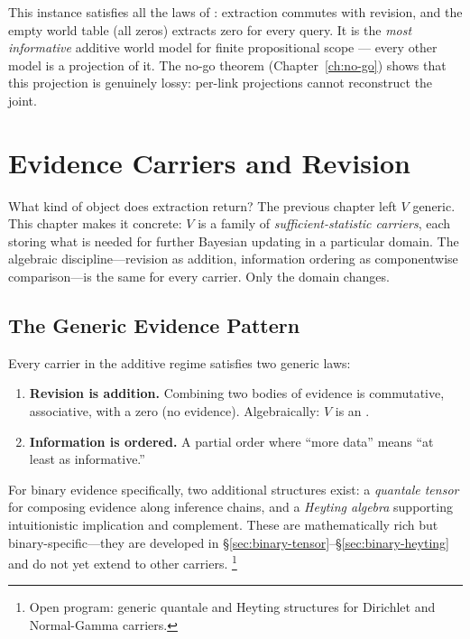 \documentclass[11pt,openany]{report}
\begin{document}
This instance satisfies all the laws of
: extraction commutes with revision, and the
empty world table (all zeros) extracts zero for every query.  It is
the \emph{most informative} additive world model for finite
propositional scope --- every other model is a projection of it.
The no-go theorem (Chapter~\ref{ch:no-go}) shows that this
projection is genuinely lossy: per-link projections cannot
reconstruct the joint.


\chapter{Evidence Carriers and Revision}
\label{ch:evidence}

What kind of object does extraction return?  The previous chapter left
$V$ generic.  This chapter makes it concrete: $V$ is a family of
\emph{sufficient-statistic carriers}, each storing what is needed for
further Bayesian updating in a particular domain.  The algebraic
discipline---revision as addition, information ordering as componentwise
comparison---is the same for every carrier.  Only the domain changes.

\section{The Generic Evidence Pattern}

Every carrier in the additive regime satisfies two generic laws:

\begin{enumerate}
\item \textbf{Revision is addition.}  Combining two bodies of evidence
  is commutative, associative, with a zero (no evidence).
  Algebraically: $V$ is an .
\item \textbf{Information is ordered.}  A partial order where ``more
  data'' means ``at least as informative.''
\end{enumerate}

\noindent
For binary evidence specifically, two additional structures exist:
a \emph{quantale tensor} for composing evidence along inference chains,
and a \emph{Heyting algebra} supporting intuitionistic implication and
complement.  These are mathematically rich but binary-specific---they
are developed in \S\ref{sec:binary-tensor}--\S\ref{sec:binary-heyting}
and do not yet extend to other carriers.%
\footnote{Open program: generic quantale and Heyting structures for
Dirichlet and Normal-Gamma carriers.}
\end{document}
